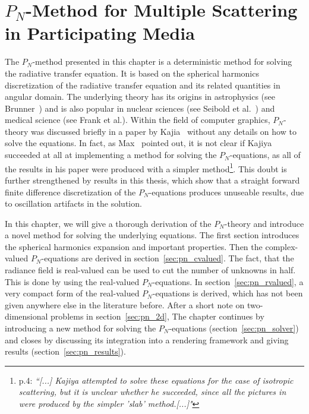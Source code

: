 \chapter{$P_N$-Method for Multiple Scattering in Participating Media}
%
\label{sec:pnmethod}

The $P_N$-method presented in this chapter is a deterministic method for solving the radiative transfer equation. It is based on the spherical harmonics discretization of the radiative transfer equation and its related quantities in angular domain. The underlying theory has its origins in astrophysics (see Brunner~\cite{Brunner02}) and is also popular in nuclear sciences (see Seibold et al.~\cite{Seibold14}) and medical science (see Frank et al.\cite{Frank08}). Within the field of computer graphics, $P_N$-theory was discussed briefly in a paper by Kajia~\cite{Kajiya84} without any details on how to solve the equations. In fact, as Max~\cite{Max95} pointed out, it is not clear if Kajiya succeeded at all at implementing a method for solving the $P_N$-equations, as all of the results in his paper were produced with a simpler method\footnote{\cite{Max95} p.4: \emph{``[...] Kajiya attempted to solve these equations for the case of isotropic scattering, but it is unclear whether he succeeded, since all the pictures in \cite{Kajiya84} were produced by the simpler 'slab' method.[...]"}}. This doubt is further strengthened by results in this thesis, which show that a straight forward finite difference discretization of the $P_N$-equations produces unuseable results, due to oscillation artifacts in the solution. 

In this chapter, we will give a thorough derivation of the $P_N$-theory and introduce a novel method for solving the underlying equations. The first section introduces the spherical harmonics expansion and important properties. Then the complex-valued $P_N$-equations are derived in section~\ref{sec:pn_cvalued}. The fact, that the radiance field is real-valued can be used to cut the number of unknowns in half. This is done by using the real-valued $P_N$-equations. In section~\ref{sec:pn_rvalued}, a very compact form of the real-valued $P_N$-equations is derived, which has not been given anywhere else in the literature before. After a short note on two-dimensional problems in section~\ref{sec:pn_2d}, The chapter continues by introducing a new method for solving the $P_N$-equations (section~\ref{sec:pn_solver}) and closes by discussing its integration into a rendering framework and giving results (section~\ref{sec:pn_results}).








